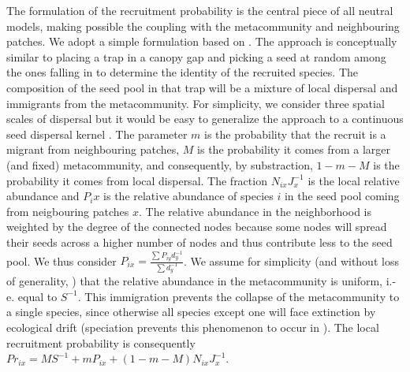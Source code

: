 \documentclass[12pt]{article}
\begin{document}
The formulation of the recruitment probability is the central piece of all
neutral models, making possible the coupling with the metacommunity and
neighbouring patches. We adopt a simple formulation based on
\parencite{Gravel2006}. The approach is conceptually similar to placing a trap
in a canopy gap and picking a seed at random among the ones falling in to
determine the identity of the recruited species. The composition of the seed
pool in that trap will be a mixture of local dispersal and immigrants from the
metacommunity. For simplicity, we consider three spatial scales of dispersal but
it would be easy to generalize the approach to a continuous seed dispersal
kernel \parencite{Gravel2006}. The parameter $m$ is the probability that the
recruit is a migrant from neighbouring patches, $M$ is the probability it comes
from a larger (and fixed) metacommunity, and consequently, by substraction,
$1-m-M$ is the probability it comes from local dispersal. The fraction
$N_{ix}J_x^{-1}$ is the local relative abundance and $P_ix$ is the relative
abundance of species $i$ in the seed pool coming from neigbouring patches $x$.
The relative abundance in the neighborhood is weighted by the degree of the
connected nodes because some nodes will spread their seeds across a higher
number of nodes and thus contribute less to the seed pool. We thus consider
$P_{ix} =\frac{\sum P_{iy}d_y^{-1}}{\sum d_y^{-1}}$. We assume for simplicity
(and without loss of generality, \parencite{Bell2000}) that the relative
abundance in the metacommunity is uniform, i.-e. equal to $S^{-1}$. This
immigration prevents the collapse of the metacommunity to a single species,
since otherwise all species except one will face extinction by ecological drift
(speciation prevents this phenomenon to occur in \textcite{Hubbell2001}). The
local recruitment probability is consequently $Pr_{ix} = MS^{-1} + mP_{ix} +
(1-m-M)N_{ix}J_x^{-1}$.
\end{document}
